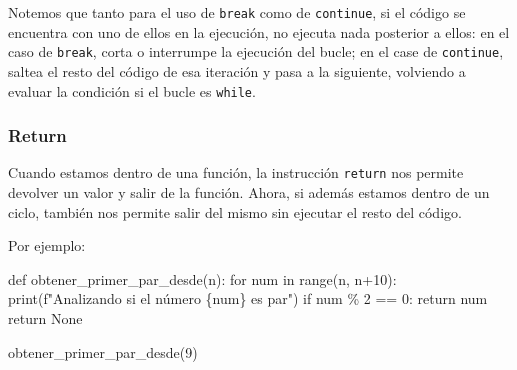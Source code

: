 \documentclass[
  letterpaper,
  DIV=11,
  numbers=noendperiod]{scrreprt}
\newenvironment{Shaded}{\begin{snugshade}}{\end{snugshade}}
\newcommand{\BuiltInTok}[1]{\textcolor[rgb]{0.00,0.23,0.31}{#1}}
\newcommand{\ControlFlowTok}[1]{\textcolor[rgb]{0.00,0.23,0.31}{#1}}
\newcommand{\DecValTok}[1]{\textcolor[rgb]{0.68,0.00,0.00}{#1}}
\newcommand{\KeywordTok}[1]{\textcolor[rgb]{0.00,0.23,0.31}{#1}}
\newcommand{\NormalTok}[1]{\textcolor[rgb]{0.00,0.23,0.31}{#1}}
\newcommand{\OperatorTok}[1]{\textcolor[rgb]{0.37,0.37,0.37}{#1}}
\newcommand{\SpecialCharTok}[1]{\textcolor[rgb]{0.37,0.37,0.37}{#1}}
\newcommand{\SpecialStringTok}[1]{\textcolor[rgb]{0.13,0.47,0.30}{#1}}
\newcommand{\VariableTok}[1]{\textcolor[rgb]{0.07,0.07,0.07}{#1}}
\begin{document}
\begin{tcolorbox}[enhanced jigsaw, bottomrule=.15mm, leftrule=.75mm, opacityback=0, colback=white, toprule=.15mm, bottomtitle=1mm, opacitybacktitle=0.6, rightrule=.15mm, left=2mm, arc=.35mm, coltitle=black, title=\textcolor{quarto-callout-note-color}{\faInfo}\hspace{0.5em}{Note}, breakable, toptitle=1mm, colframe=quarto-callout-note-color-frame, titlerule=0mm, colbacktitle=quarto-callout-note-color!10!white]

Notemos que tanto para el uso de \texttt{break} como de
\texttt{continue}, si el código se encuentra con uno de ellos en la
ejecución, no ejecuta nada posterior a ellos: en el caso de
\texttt{break}, corta o interrumpe la ejecución del bucle; en el case de
\texttt{continue}, saltea el resto del código de esa iteración y pasa a
la siguiente, volviendo a evaluar la condición si el bucle es
\texttt{while}.

\end{tcolorbox}

\subsubsection{Return}\label{return}

Cuando estamos dentro de una función, la instrucción \texttt{return} nos
permite devolver un valor y salir de la función. Ahora, si además
estamos dentro de un ciclo, también nos permite salir del mismo sin
ejecutar el resto del código.

Por ejemplo:

\begin{Shaded}
\begin{Highlighting}[]
\KeywordTok{def}\NormalTok{ obtener\_primer\_par\_desde(n):}
  \ControlFlowTok{for}\NormalTok{ num }\KeywordTok{in} \BuiltInTok{range}\NormalTok{(n, n}\OperatorTok{+}\DecValTok{10}\NormalTok{):}
    \BuiltInTok{print}\NormalTok{(}\SpecialStringTok{f"Analizando si el número }\SpecialCharTok{\{}\NormalTok{num}\SpecialCharTok{\}}\SpecialStringTok{ es par"}\NormalTok{)}
    \ControlFlowTok{if}\NormalTok{ num }\OperatorTok{\%} \DecValTok{2} \OperatorTok{==} \DecValTok{0}\NormalTok{:}
      \ControlFlowTok{return}\NormalTok{ num}
  \ControlFlowTok{return} \VariableTok{None}
\end{Highlighting}
\end{Shaded}

\begin{Shaded}
\begin{Highlighting}[]
\NormalTok{obtener\_primer\_par\_desde(}\DecValTok{9}\NormalTok{)}
\end{Highlighting}
\end{Shaded}
\end{document}

